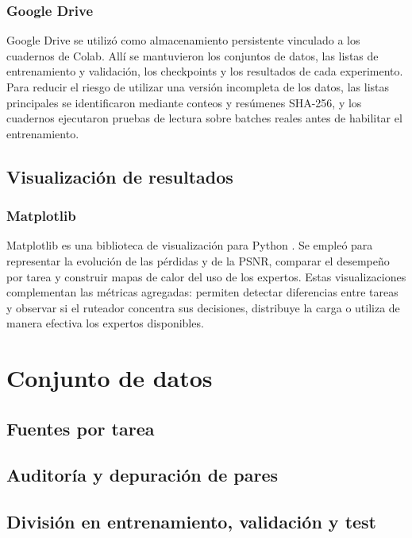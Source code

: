 \documentclass[
  11pt,
  oneside,
  english,
  spanish,
  singlespacing,
  headsepline
]{MastersDoctoralThesis}
\begin{document}
\subsection{Google Drive}

Google Drive se utilizó como almacenamiento persistente vinculado a los cuadernos de Colab. Allí se mantuvieron los conjuntos de datos, las listas de entrenamiento y validación, los checkpoints y los resultados de cada experimento. Para reducir el riesgo de utilizar una versión incompleta de los datos, las listas principales se identificaron mediante conteos y resúmenes SHA-256, y los cuadernos ejecutaron pruebas de lectura sobre batches reales antes de habilitar el entrenamiento.

\section{Visualización de resultados}

\subsection{Matplotlib}

Matplotlib es una biblioteca de visualización para Python \citep{hunter2007matplotlib}. Se empleó para representar la evolución de las pérdidas y de la PSNR, comparar el desempeño por tarea y construir mapas de calor del uso de los expertos. Estas visualizaciones complementan las métricas agregadas: permiten detectar diferencias entre tareas y observar si el ruteador concentra sus decisiones, distribuye la carga o utiliza de manera efectiva los expertos disponibles.

\chapter{Conjunto de datos}
\label{chap:datos}

\section{Fuentes por tarea}
\label{sec:fuentes}

\section{Auditoría y depuración de pares}
\label{sec:auditoria}

\section{División en entrenamiento, validación y test}
\label{sec:split}
\end{document}
